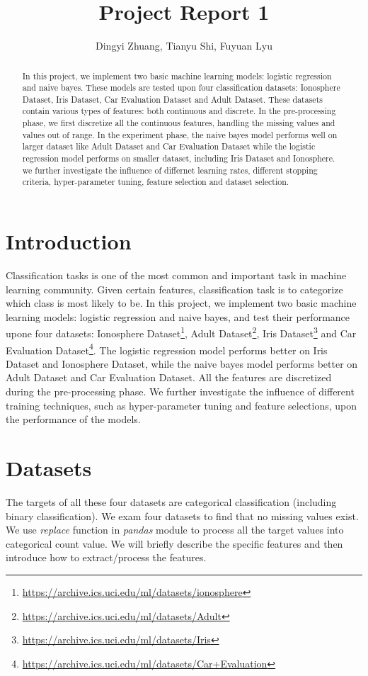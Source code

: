 \documentclass[11pt]{scrartcl}
\title{Project Report 1}
\author{Dingyi Zhuang, Tianyu Shi, Fuyuan Lyu}
\begin{document}
\maketitle

\begin{abstract}
In this project, we implement two basic machine learning models: logistic regression and naive bayes. These models are tested upon four classification datasets: Ionosphere Dataset, Iris Dataset, Car Evaluation Dataset and Adult Dataset. These datasets contain various types of features: both continuous and discrete. In the pre-processing phase, we first discretize all the continuous features, handling the missing values and values out of range. In the experiment phase, the naive bayes model performs well on larger dataset like Adult Dataset and Car Evaluation Dataset while the logistic regression model performs on smaller dataset, including Iris Dataset and Ionosphere. we further investigate the influence of differnet learning rates, different stopping criteria, hyper-parameter tuning, feature selection and dataset selection.

\end{abstract}

\section{Introduction}
Classification tasks is one of the most common and important task in machine learning community. Given certain features, classification task is to categorize which class is most likely to be. In this project, we implement two basic machine learning models: logistic regression and naive bayes, and test their performance upone four datasets: Ionosphere Dataset\footnote{\url{https://archive.ics.uci.edu/ml/datasets/ionosphere}}, Adult Dataset\footnote{\url{https://archive.ics.uci.edu/ml/datasets/Adult}}, Iris Dataset\footnote{\url{https://archive.ics.uci.edu/ml/datasets/Iris}} and Car Evaluation Dataset\footnote{\url{https://archive.ics.uci.edu/ml/datasets/Car+Evaluation}}. The logistic regression model performs better on Iris Dataset and Ionosphere Dataset, while the naive bayes model performs better on Adult Dataset and Car Evaluation Dataset. All the features are discretized during the pre-processing phase. We further investigate the influence of different training techniques, such as hyper-parameter tuning and feature selections, upon the performance of the models.

\section{Datasets}
The targets of all these four datasets are categorical classification (including binary classification). We exam four datasets to find that no missing values exist. We use \textit{replace} function in \textit{pandas} module to process all the target values into categorical count value. We will briefly describe the specific features and then introduce how to extract/process the features.
\end{document}
